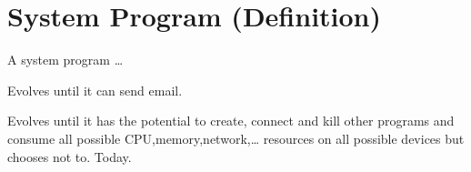 \section{System Program (Definition)}\label{system-program-definition}

A system program \ldots{}

Evolves until it can send email.

Evolves until it has the potential to create, connect and kill other
programs and consume all possible CPU,memory,network,\ldots{} resources
on all possible devices but chooses not to. Today.
